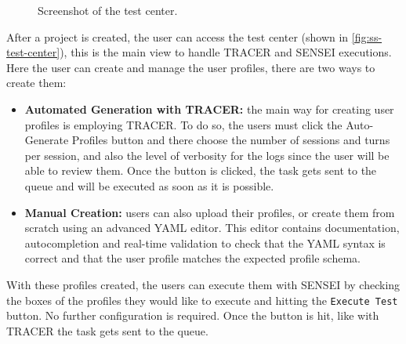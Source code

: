 \begin{figure}[!htb]
  \centering
  \caption{Screenshot of the test center.}
  \label{fig:ss-test-center}
\end{figure}

After a project is created,
the user can access the test center
(shown in \autoref{fig:ss-test-center}),
this is the main view to handle \ac{TRACER} and SENSEI executions.
Here the user can create and manage the user profiles,
there are two ways to create them:
\begin{itemize}
  \item \textbf{Automated Generation with \ac{TRACER}:}
    the main way for creating user profiles is employing \ac{TRACER}.
    To do so, the users must click the Auto-Generate Profiles button
    and there choose the number of sessions and turns per session,
    and also the level of verbosity for the logs
    since the user will be able to review them.
    Once the button is clicked, the task gets sent to the queue
    and will be executed as soon as it is possible.
  \item \textbf{Manual Creation:}
    users can also upload their profiles,
    or create them from scratch using an advanced YAML editor.
    This editor contains documentation, autocompletion
    and real-time validation to check that the YAML syntax is correct
    and that the user profile matches the expected profile schema.
\end{itemize}

With these profiles created,
the users can execute them with SENSEI
by checking the boxes of the profiles they would like to execute
and hitting the \texttt{Execute Test} button.
No further configuration is required.
Once the button is hit, like with \ac{TRACER}
the task gets sent to the queue.

